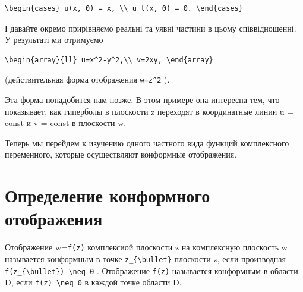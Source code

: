 \documentclass[
  ukrainian,
]{article}
\begin{document}
\begin{verbatim}
\begin{cases} u(x, 0) = x, \\ u_t(x, 0) = 0. \end{cases}
\end{verbatim}

І давайте окремо прирівняємо реальні та уявні частини в цьому
співвідношенні. У результаті ми отримуємо

\begin{verbatim}
\begin{array}{ll} u=x^2-y^2,\\ v=2xy, \end{array}
\end{verbatim}

(действительная форма отображения \texttt{w=z\^{}2} ).

Эта форма понадобится нам позже. В этом примере она интересна тем, что
показывает, как гиперболы в плоскости z переходят в координатные линии u
= const и v = const в плоскости w.

Теперь мы перейдем к изучению одного частного вида функций комплексного
переменного, которые осуществляют конформные отображения.

\section{Определение конформного
отображения}\label{ux43eux43fux440ux435ux434ux435ux43bux435ux43dux438ux435-ux43aux43eux43dux444ux43eux440ux43cux43dux43eux433ux43e-ux43eux442ux43eux431ux440ux430ux436ux435ux43dux438ux44f}

Отображение w=\texttt{f(z)} комплексиой плоскости z на комплексную
плоскость w называется конформным в точке
\texttt{z\_\{\textbackslash{}bullet\}} плоскости z, если производная
\texttt{f\textquotesingle{}(z\_\{\textbackslash{}bullet\})\ \textbackslash{}neq\ 0}
. Отображение \texttt{f(z)} называется конформным в области D, если
\texttt{f\textquotesingle{}(z)\ \textbackslash{}neq\ 0} в каждой точке
области D.
\end{document}
